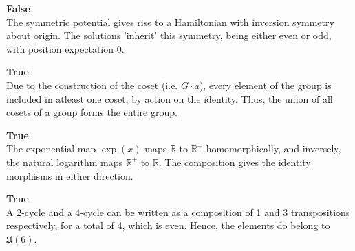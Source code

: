 \begin{alphaparts}
    \questionpart
    \textbf{False} \\
    The symmetric potential gives rise to a Hamiltonian with
    inversion symmetry about origin. The solutions 'inherit' 
    this symmetry, being either even or odd, with position
    expectation 0.    

    \questionpart
    \textbf{True} \\
    Due to the construction of the coset (i.e. $G \cdot a$), every 
    element of the group is included in atleast one coset, by action
    on the identity. Thus, the union of all cosets of a group forms 
    the entire group.

    \questionpart
    \textbf{True} \\
    The exponential map $\exp(x)$ maps $\mathbb{R}$ to $\mathbb{R}^+$
    homomorphically, and inversely, the natural logarithm maps $\mathbb{R}^+$
    to $\mathbb{R}$. The composition gives the identity morphisms
    in either direction.

    \questionpart
    \textbf{True} \\
    A 2-cycle and a 4-cycle can be written as a composition of 
    1 and 3 transpositions respectively, for a total of 4, which is 
    even. Hence, the elements do belong to $\mathfrak{U} (6)$. 

\end{alphaparts}